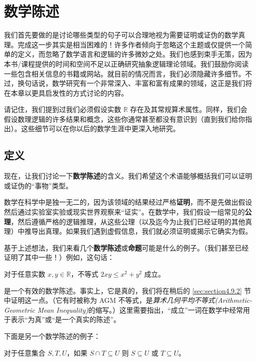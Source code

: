 \section{数学陈述}

我们首先要做的是讨论哪些类型的句子可以合理地视为需要证明或证伪的数学真理。完成这一步其实是相当困难的！许多作者倾向于忽略这个主题或仅提供一个简单的定义，而忽略了数学语言和逻辑的许多微妙之处。我们也感到束手无策，因为本书/课程提供的时间和空间不足以正确研究抽象逻辑理论领域。我们鼓励你阅读一些包含相关信息的书籍或网站。就目前的情况而言，我们必须隐藏许多细节。不过，换句话说，数学研究有一个非常深入、丰富和富有成果的领域，这正是我们将在本章以更具启发性的方式讨论的内容。

请记住，我们提到过我们必须假设实数 $\mathbb{R}$ 存在及其常规算术属性。同样，我们会假设数理逻辑的许多结果和概念，这些你通常甚至都没有意识到（直到我们给你指出）。这些细节可以在你以后的数学生涯中更深入地研究。

\subsection{定义}

现在，让我们讨论一下\textbf{数学陈述}的含义。我们希望这个术语能够概括我们可以证明或证伪的``事物''类型。

数学在科学中是独一无二的，因为该领域的结果经过严格\textbf{证明}，而不是先做出假设然后通过实验室实验或现实世界观察来``证实''。在数学中，我们假设一组常见的\textbf{公理}，然后遵循严格的逻辑推理，从这些公理（以及迄今为止我们已经证明的其他真理）中推导出真理。如果我们遇到虚假信息，我们就必须证明或揭示它确实为假。

基于上述想法，我们来看几个\textbf{数学陈述}或\textbf{命题}可能是什么的例子。（我们甚至已经证明了其中一些！）例如，这句话：
\begin{center}
    \textcolor{olivegreen}{对于任意实数 $x, y \in \mathbb{R}$，不等式 $2xy \le x^2 + y^2$ 成立。}
\end{center}
是一个有效的数学陈述。事实上，它是真的，我们将在稍后的 \ref{sec:section4.9.2} 节中证明这一点。（它有时被称为 AGM 不等式，是\emph{算术几何平均不等式(Arithmetic-Geometric Mean Inequality)}的缩写。）这里需要指出，``成立''一词在数学中经常用于表示``为真''或``是一个真实的陈述''。

下面是另一个数学陈述的例子：
\begin{center}
    \textcolor{olivegreen}{对于任意集合 $S, T, U$，如果 $S \cap T \subseteq U$ 则 $S \subseteq U$ 或 $T \subseteq U$。}
\end{center}

